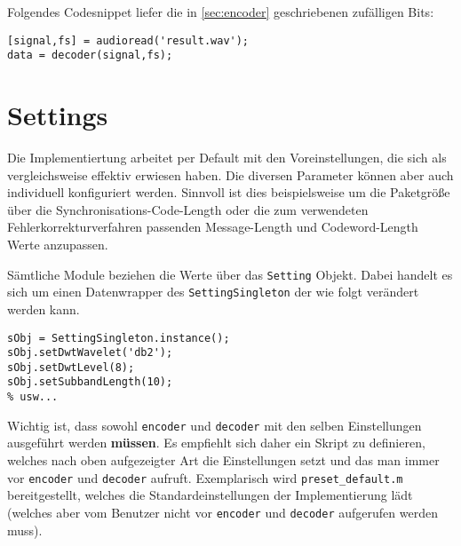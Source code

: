 Folgendes Codesnippet liefer die in \ref{sec:encoder} geschriebenen zufälligen Bits:

\begin{verbatim}
[signal,fs] = audioread('result.wav');
data = decoder(signal,fs);
\end{verbatim}


\section{Settings}

Die Implementiertung arbeitet per Default mit den Voreinstellungen, die sich als vergleichsweise effektiv erwiesen haben. Die diversen Parameter können aber auch individuell konfiguriert werden. Sinnvoll ist dies beispielsweise um die Paketgröße über die Synchronisations-Code-Length oder die zum verwendeten Fehlerkorrekturverfahren passenden Message-Length und Codeword-Length Werte anzupassen.

Sämtliche Module beziehen die Werte über das \texttt{Setting} Objekt. Dabei handelt es sich um einen Datenwrapper des \texttt{SettingSingleton} der wie folgt verändert werden kann. 

\begin{verbatim}
sObj = SettingSingleton.instance();
sObj.setDwtWavelet('db2');
sObj.setDwtLevel(8);
sObj.setSubbandLength(10);
% usw...
\end{verbatim}

Wichtig ist, dass sowohl \texttt{encoder} und \texttt{decoder} mit den selben Einstellungen ausgeführt werden \textbf{müssen}. Es empfiehlt sich daher ein Skript zu definieren, welches nach oben aufgezeigter Art die Einstellungen setzt und das man immer vor \texttt{encoder} und \texttt{decoder} aufruft. Exemplarisch wird \texttt{preset\_default.m} bereitgestellt, welches die Standardeinstellungen der Implementierung lädt (welches aber vom Benutzer nicht vor \texttt{encoder} und \texttt{decoder} aufgerufen werden muss).









